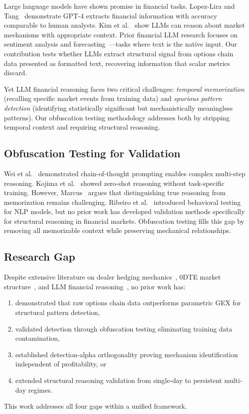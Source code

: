 Large language models have shown promise in financial tasks. Lopez-Lira and Tang~\cite{lopez2023can} demonstrate GPT-4 extracts financial information with accuracy comparable to human analysts. Kim et al.~\cite{kim2024financial} show LLMs can reason about market mechanisms with appropriate context. Prior financial LLM research focuses on sentiment analysis and forecasting~\cite{wu2023bloomberggpt,chen2023fingpt}---tasks where text is the native input. Our contribution tests whether LLMs extract structural signal from options chain data presented as formatted text, recovering information that scalar metrics discard.

Yet LLM financial reasoning faces two critical challenges: \textit{temporal memorization} (recalling specific market events from training data) and \textit{spurious pattern detection} (identifying statistically significant but mechanistically meaningless patterns). Our obfuscation testing methodology addresses both by stripping temporal context and requiring structural reasoning.

\subsection{Obfuscation Testing for Validation}

Wei et al.~\cite{wei2022chain} demonstrated chain-of-thought prompting enables complex multi-step reasoning. Kojima et al.~\cite{kojima2022large} showed zero-shot reasoning without task-specific training. However, Marcus~\cite{marcus2019rebooting} argues that distinguishing true reasoning from memorization remains challenging. Ribeiro et al.~\cite{ribeiro2020beyond} introduced behavioral testing for NLP models, but no prior work has developed validation methods specifically for structural reasoning in financial markets. Obfuscation testing fills this gap by removing all memorizable context while preserving mechanical relationships.

\subsection{Research Gap}

Despite extensive literature on dealer hedging mechanics~\cite{ni2005stock,garleanu2009demand}, 0DTE market structure~\cite{dim2025zero}, and LLM financial reasoning~\cite{lopez2023can,kim2024financial}, no prior work has:
\begin{enumerate}
\item demonstrated that raw options chain data outperforms parametric GEX for structural pattern detection,
\item validated detection through obfuscation testing eliminating training data contamination,
\item established detection-alpha orthogonality proving mechanism identification independent of profitability, or
\item extended structural reasoning validation from single-day to persistent multi-day regimes.
\end{enumerate}
This work addresses all four gaps within a unified framework.

